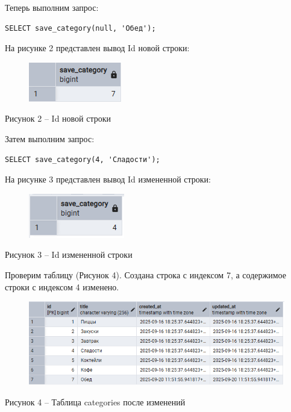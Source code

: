 \documentclass[a4paper,14pt]{extarticle}
\begin{document}
  Теперь выполним запрос:

  \noindent
  \begin{Verbatim}[tabsize=4,fontsize=\small]
SELECT save_category(null, 'Обед');
  \end{Verbatim}

  На рисунке 2 представлен вывод Id новой строки:

  \begin{figure}[h]
    \centering
    \includegraphics[width=0.2\linewidth]{img/t-1-2}
  \end{figure}
  \begin{center}
    Рисунок 2 – Id новой строки
  \end{center}

  Затем выполним запрос:

  \noindent
  \begin{Verbatim}[tabsize=4,fontsize=\small]
SELECT save_category(4, 'Сладости');
  \end{Verbatim}

  На рисунке 3 представлен вывод Id измененной строки:

  \begin{figure}[h]
    \centering
    \includegraphics[width=0.2\linewidth]{img/t-1-3}
  \end{figure}
  \begin{center}
    Рисунок 3 – Id измененной строки
  \end{center}

  Проверим таблицу (Рисунок 4). Создана строка с индексом 7, а содержимое строки с индексом 4 изменено.

  \pagebreak
  \begin{figure}[h]
    \centering
    \includegraphics[width=1\linewidth]{img/t-1-4}
  \end{figure}
  \begin{center}
    Рисунок 4 – Таблица categories после изменений
  \end{center}
\end{document}
